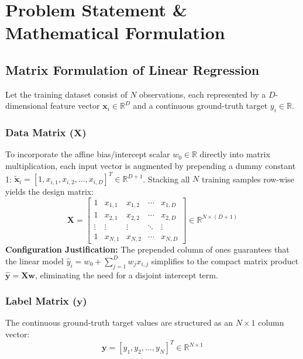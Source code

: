\documentclass[12pt,a4paper]{article}
\begin{document}
\section{Problem Statement \& Mathematical Formulation}

\subsection{Matrix Formulation of Linear Regression}
Let the training dataset consist of $N$ observations, each represented by a $D$-dimensional feature vector $\mathbf{x}_i \in \mathbb{R}^D$ and a continuous ground-truth target $y_i \in \mathbb{R}$.

\subsubsection{\texorpdfstring{Data Matrix ($\mathbf{X}$)}{Data Matrix (X)}}
To incorporate the affine bias/intercept scalar $w_0 \in \mathbb{R}$ directly into matrix multiplication, each input vector is augmented by prepending a dummy constant 1: $\tilde{\mathbf{x}}_i = [1, x_{i,1}, x_{i,2}, \dots, x_{i,D}]^T \in \mathbb{R}^{D+1}$. Stacking all $N$ training samples row-wise yields the design matrix:
\begin{equation}
\mathbf{X} = \begin{bmatrix}
1 & x_{1,1} & x_{1,2} & \cdots & x_{1,D} \\
1 & x_{2,1} & x_{2,2} & \cdots & x_{2,D} \\
\vdots & \vdots & \vdots & \ddots & \vdots \\
1 & x_{N,1} & x_{N,2} & \cdots & x_{N,D}
\end{bmatrix} \in \mathbb{R}^{N \times (D+1)}
\end{equation}
\textbf{Configuration Justification:} The prepended column of ones guarantees that the linear model $\hat{y}_i = w_0 + \sum_{j=1}^D w_j x_{i,j}$ simplifies to the compact matrix product $\hat{\mathbf{y}} = \mathbf{X}\mathbf{w}$, eliminating the need for a disjoint intercept term.

\subsubsection{\texorpdfstring{Label Matrix ($\mathbf{y}$)}{Label Matrix (y)}}
The continuous ground-truth target values are structured as an $N \times 1$ column vector:
\begin{equation}
\mathbf{y} = [y_1, y_2, \dots, y_N]^T \in \mathbb{R}^{N \times 1}
\end{equation}
\end{document}
